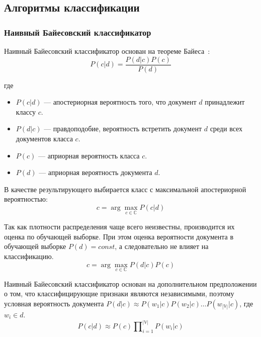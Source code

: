 \subsection{Алгоритмы классификации}

\subsubsection{Наивный Байесовский классификатор}
Наивный Байесовский классификатор основан на теореме Байеса~\cite{naive_bayes}:
\begin{equation}
P(c | d) = \frac{P(d | c) P(c)}{P(d)}
\end{equation}

где
\begin{itemize}

\item
$P(c | d)$ --- апостериорная вероятность того, что документ $d$ принадлежит классу $c$.

\item
$P(d | c)$ --- правдоподобие, вероятность встретить документ $d$ среди всех документов класса $c$.

\item
$P(c)$ --- априорная вероятность класса $c$. 

\item
$P(d)$ --- априорная вероятность документа $d$. 

\end{itemize}

В качестве результирующего выбирается класс с максимальной апостериорной вероятностью:
\begin{equation}
c = \arg\!\underset{c \in \mathbb{C}}{\max} P(c | d)
\end{equation}

Так как плотности распределения чаще всего неизвестны, производится их оценка
по обучающей выборке. При этом оценка вероятности документа в обучающей 
выборке $P(d) = const$, а следовательно не влияет на классификацию.
\begin{equation}
c = \arg\!\underset{c \in \mathbb{C}}{\max} P(d | c) P(c)
\end{equation}

Наивный Байесовский классификатор основан на дополнительном предположении
о том, что классифицирующие признаки являются независимыми, поэтому
условная вероятность документа $P(d | c) \approx P(w_1 | c) P(w_2 | c) \ldots P(w_{|\mathbb{V}|} | c) $, где $w_i \in d$.
\begin{equation}
P(c | d) \approx P(c) \prod\nolimits_{i=1}^{|\mathbb{V}|} P(w_i | c) 
\end{equation}

